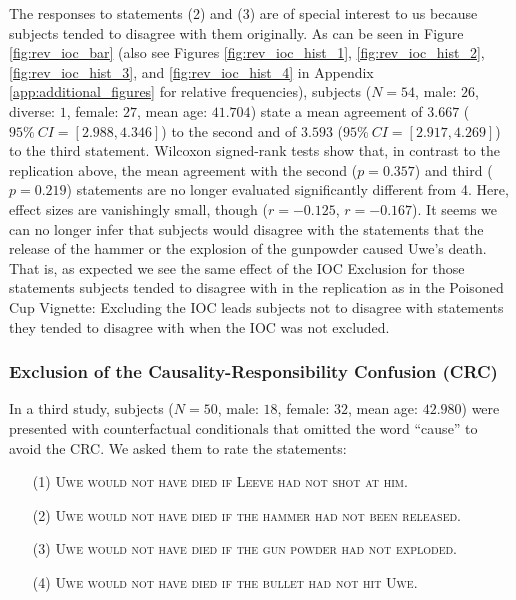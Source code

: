\documentclass[egregdoesnotlikesansseriftitles,12pt]{scrartcl}
\begin{document}
\noindent The responses to statements (2) and (3) are of special interest to us because subjects tended to disagree with them originally. As can be seen in Figure \ref{fig:rev_ioc_bar} (also see Figures \ref{fig:rev_ioc_hist_1}, \ref{fig:rev_ioc_hist_2}, \ref{fig:rev_ioc_hist_3}, and \ref{fig:rev_ioc_hist_4} in Appendix \ref{app:additional_figures} for relative frequencies), subjects ($N=54$, male: $26$, diverse: $1$, female: $27$, mean age: $41.704$) state a mean agreement of $3.667$ ($95\%~CI=[2.988,4.346]$) to the second and of $3.593$ ($95\%~CI=[2.917,4.269]$) to the third statement. Wilcoxon signed-rank tests show that, in contrast to the replication above, the mean agreement with the second ($p=0.357$) and third ($p=0.219$) statements are no longer evaluated significantly different from 4. Here, effect sizes are vanishingly small, though ($r=-0.125$, $r=-0.167$). It seems we can no longer infer that subjects would disagree with the statements that the release of the hammer or the explosion of the gunpowder caused Uwe's death. That is, as expected we see the same effect of the IOC Exclusion for those statements subjects tended to disagree with in the replication as in the Poisoned Cup Vignette: Excluding the IOC leads subjects not to disagree with statements they tended to disagree with when the IOC was not excluded.

\subsubsection{Exclusion of the Causality-Responsibility Confusion (CRC)}\label{sec:results_rev_crc}
In a third study, subjects ($N=50$, male: $18$, female: $32$, mean age: $42.980$) were presented with counterfactual conditionals that omitted the word ``cause'' to avoid the CRC. We asked them to rate the statements:

\begin{itemize}
   \item[(1)]\textsc{Uwe would not have died if Leeve had not shot at him.}
   \item[(2)]\textsc{Uwe would not have died if the hammer had not been released.}
   \item[(3)]\textsc{Uwe would not have died if the gun powder had not exploded.}
   \item[(4)]\textsc{Uwe would not have died if the bullet had not hit Uwe.}
\end{itemize}
\end{document}
